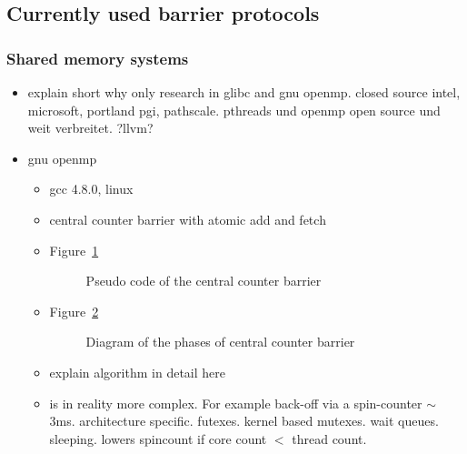 \documentclass[a4paper, 10pt]{article}
\begin{document}
\subsection{Currently used barrier protocols}
\label{ssec:existing-currently-used}

\subsubsection{Shared memory systems}
\label{sssec:existing-currently-used-shared}
\begin{itemize}
	\item explain short why only research in glibc and gnu openmp\cite{openmp}. closed source intel, microsoft, portland pgi, pathscale. pthreads und openmp open source und weit verbreitet. ?llvm?
	\item gnu openmp\cite{gomp}
		\begin{itemize}
			\item gcc 4.8.0, linux
			\item central counter barrier with atomic add and fetch
			\item Figure~\ref{fig:pseudo-code-central-counter}
				\begin{figure}[htbp]
					\centering
					
					\caption{Pseudo code of the central counter barrier}
					\label{fig:pseudo-code-central-counter}
				\end{figure}
			\item Figure~\ref{fig:diagram-central-counter}
				\begin{figure}[htbp]
					\centering
					
					\caption{Diagram of the phases of central counter barrier}
					\label{fig:diagram-central-counter}
				\end{figure}
			\item explain algorithm in detail here
			\item is in reality more complex. For example back-off via a spin-counter $\sim$ 3ms. architecture specific. futexes\cite{franke2002}. kernel based mutexes. wait queues. sleeping. lowers spincount if core count $<$ thread count.

\end{itemize}
\end{itemize}
\end{document}
